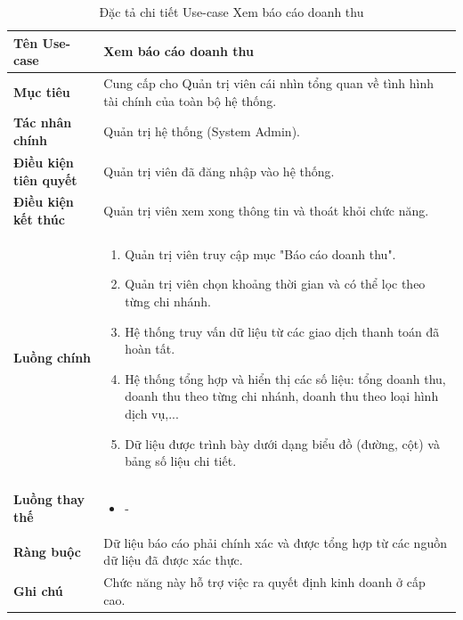 

\begin{table}[H]
\centering
\renewcommand{\arraystretch}{1.3}
\begin{tabular}{|p{4cm}|p{10cm}|}
\hline
\textbf{Tên Use-case} 
& Xem báo cáo doanh thu \\ 
\hline

\textbf{Mục tiêu} 
& Cung cấp cho Quản trị viên cái nhìn tổng quan về tình hình tài chính của toàn bộ hệ thống. \\ 
\hline

\textbf{Tác nhân chính} 
& Quản trị hệ thống (System Admin). \\ 
\hline

\textbf{Điều kiện tiên quyết} 
& Quản trị viên đã đăng nhập vào hệ thống. \\ 
\hline

\textbf{Điều kiện kết thúc} 
& Quản trị viên xem xong thông tin và thoát khỏi chức năng. \\ 
\hline

\textbf{Luồng chính} 
& 
\begin{enumerate}
    \item Quản trị viên truy cập mục "Báo cáo doanh thu".
    \item Quản trị viên chọn khoảng thời gian và có thể lọc theo từng chi nhánh.
    \item Hệ thống truy vấn dữ liệu từ các giao dịch thanh toán đã hoàn tất.
    \item Hệ thống tổng hợp và hiển thị các số liệu: tổng doanh thu, doanh thu theo từng chi nhánh, doanh thu theo loại hình dịch vụ,...
    \item Dữ liệu được trình bày dưới dạng biểu đồ (đường, cột) và bảng số liệu chi tiết.
\end{enumerate} \\ 
\hline

\textbf{Luồng thay thế} 
& 
\begin{itemize}
    \item -
\end{itemize} \\ 
\hline

\textbf{Ràng buộc} 
& Dữ liệu báo cáo phải chính xác và được tổng hợp từ các nguồn dữ liệu đã được xác thực. \\ 
\hline

\textbf{Ghi chú} 
& Chức năng này hỗ trợ việc ra quyết định kinh doanh ở cấp cao. \\ 
\hline
\end{tabular}
\caption{Đặc tả chi tiết Use-case Xem báo cáo doanh thu}
\label{tab:revenue-report-spec}
\end{table}



